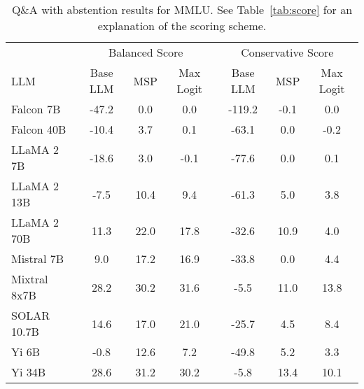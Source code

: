 \begin{table*}
\centering
\caption{Q\&A with abstention results for MMLU. See Table~\ref{tab:score} for an explanation of the scoring scheme.}
\label{tab:mmlu_score}
\begin{tabular}{lcccccc}
\toprule
& \multicolumn{3}{c}{Balanced Score} & \multicolumn{3}{c}{Conservative Score} \\ 
LLM & Base LLM & MSP & Max Logit & Base LLM & MSP & Max Logit\\ 
\cmidrule(lr){1-1} \cmidrule(lr){2-4} \cmidrule(lr){5-7}
Falcon 7B & -47.2 & 0.0 & 0.0 & -119.2 & -0.1 & 0.0\\
Falcon 40B & -10.4 & 3.7 & 0.1 & -63.1 & 0.0 & -0.2\\
LLaMA 2 7B & -18.6 & 3.0 & -0.1 & -77.6 & 0.0 & 0.1\\
LLaMA 2 13B & -7.5 & 10.4 & 9.4 & -61.3 & 5.0 & 3.8\\
LLaMA 2 70B & 11.3 & 22.0 & 17.8 & -32.6 & 10.9 & 4.0\\
Mistral 7B & 9.0 & 17.2 & 16.9 & -33.8 & 0.0 & 4.4\\
Mixtral 8x7B & 28.2 & 30.2 & 31.6 & -5.5 & 11.0 & 13.8\\
SOLAR 10.7B & 14.6 & 17.0 & 21.0 & -25.7 & 4.5 & 8.4\\
Yi 6B & -0.8 & 12.6 & 7.2 & -49.8 & 5.2 & 3.3\\
Yi 34B & 28.6 & 31.2 & 30.2 & -5.8 & 13.4 & 10.1\\
\bottomrule
\end{tabular}
\end{table*}


